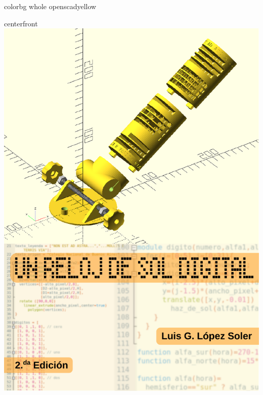 \documentclass[coverwidth=148mm, coverheight=210mm, spinewidth=37mm,
flapwidth=7cm, wrapwidth=3mm, 11pt]{bookcover}
\begin{document}
\begin{bookcover}

  \begin{bookcoverelement}{color}{bg whole}
    openscadyellow
  \end{bookcoverelement}

  \begin{bookcoverelement}{center}{front}
    \includegraphics[width=\partwidth]{tapa-A5.pdf}
  \end{bookcoverelement}


\end{bookcover}
\end{document}
